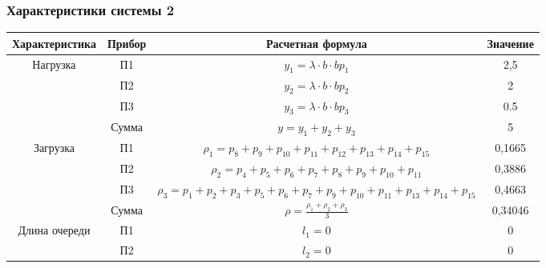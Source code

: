 \subsubsection{Характеристики системы 2}
\begin{adjustbox}{max width=\textwidth}
\begin{tabular}{|c|c|c|c|}
\hline
Характеристика                      & Прибор & Расчетная формула                                                                                        & Значение \\ \hline
\multirow{4}{*}{Нагрузка}           & П1     & $y_1 = \lambda\cdot b\cdot b p_1$                                                                        & 2,5      \\ \cline{2-4}
                                    & П2     & $y_2 = \lambda\cdot b\cdot b p_2$                                                                        & 2        \\ \cline{2-4}
                                    & П3     & $y_3 = \lambda\cdot b\cdot b p_3$                                                                        & 0.5      \\ \cline{2-4}
                                    & Сумма  & $y = y_1 + y_2 + y_3$                                                                                    & 5        \\ \hline
\multirow{4}{*}{Загрузка}           & П1     & $\rho_1 = p_8 + p_9 + p_{10} + p_{11} + p_{12} + p_{13} + p_{14} + p_{15}$                                           & 0,1665   \\ \cline{2-4}
                                    & П2     & $\rho_2 = p_4 + p_5 + p_6 + p_7 + p_8 + p_9 + p_{10} + p_{11}$                                               & 0,3886   \\ \cline{2-4}
                                    & П3     & $\rho_3 = p_1 + p_2 + p_3 + p_5 + p_6 + p_7 + p_9 + p_{10} + p_{11} + p_{13} + p_{14} + p_{15}$                    & 0,4663   \\ \cline{2-4}
                                    & Сумма  & $\rho = \frac{\rho_1 + \rho_2 + \rho_3}{3}$                                                              & 0,34046  \\ \hline
\multirow{4}{*}{Длина очереди}      & П1     & $l_1 = 0$                                                                                                & 0        \\ \cline{2-4}
                                    & П2     & $l_2 = 0$                                                                                                & 0        \\ \cline{2-4}

\end{tabular}
\end{adjustbox}
